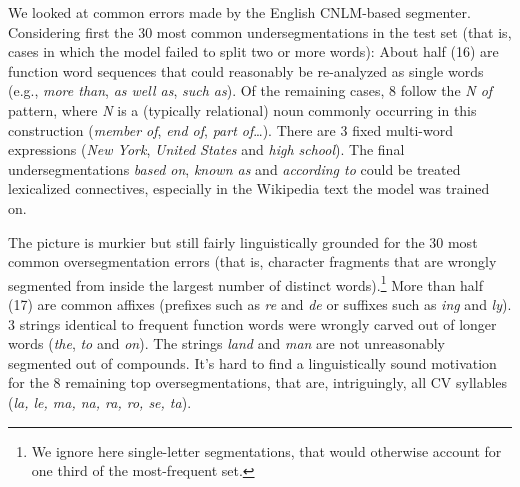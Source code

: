 
We looked at common errors made by the English CNLM-based segmenter. Considering first the 30 most common undersegmentations
in the test set (that is, cases in which the model failed to split two
or more words): About half (16) are function word
sequences that could reasonably be re-analyzed as single words (e.g.,
\emph{more than}, \emph{as well as}, \emph{such as}). Of the remaining
cases, 8 follow the \emph{N of} pattern, where \emph{N} is a
(typically relational) noun commonly occurring in this construction
(\emph{member of}, \emph{end of}, \emph{part of}\ldots). There are 3
fixed multi-word expressions (\emph{New York}, \emph{United States}
and \emph{high school}). The final undersegmentations \emph{based on}, \emph{known as} and
\emph{according to} could be treated lexicalized connectives,
especially in the Wikipedia text the model was trained on.

The picture is murkier but still fairly linguistically grounded
for the 30 most common oversegmentation errors (that is, character
fragments that are wrongly segmented from inside the largest number of
distinct words).\footnote{We ignore here single-letter segmentations,
  that would otherwise account for one third of the most-frequent
  set.}  More than half (17) are common affixes (prefixes such as
\emph{re} and \emph{de} or suffixes such as \emph{ing} and
\emph{ly}). 3 strings identical to frequent
function words were wrongly carved out of longer words (\emph{the},
\emph{to} and \emph{on}). %
The strings \emph{land} and \emph{man} are not unreasonably segmented
out of compounds. It's hard to find a linguistically sound motivation
for the 8 remaining top oversegmentations, that are, intriguingly, all CV
syllables (\emph{la, le, ma, na, ra, ro, se, ta}).


